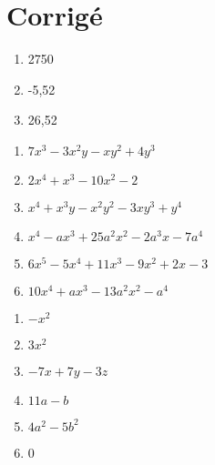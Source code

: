 \section{Corrigé}
\begin{solution} \hfill \vspace{-0.8cm}
\begin{multicols}{3} 
\begin{enumerate} 
\item 2750
\item -5,52
\item 26,52
\end{enumerate}
\end{multicols}
\end{solution}

\begin{solution} \hfill \vspace{-0.8cm}
\begin{multicols}{2}
\begin{enumerate}
\item $7{{x}^{3}}-3{{x}^{2}}y-x{{y}^{2}}+4{{y}^{3}}$	
\item $2{{x}^{4}}+{{x}^{3}}-10{{x}^{2}}-2$	
\item ${{x}^{4}}+{{x}^{3}}y-{{x}^{2}}{{y}^{2}}-3x{{y}^{3}}+{{y}^{4}}$	
\item ${{x}^{4}}-a{{x}^{3}}+25{{a}^{2}}{{x}^{2}}-2{{a}^{3}}x-7{{a}^{4}}$
\item $6{{x}^{5}}-5{{x}^{4}}+11{{x}^{3}}-9{{x}^{2}}+2x-3$
\item $10{{x}^{4}}+a{{x}^{3}}-13{{a}^{2}}{{x}^{2}}-{{a}^{4}}$
\end{enumerate}
\end{multicols}
\end{solution}
	
\begin{solution} \hfill \vspace{-0.8cm}
\begin{multicols}{2}
\begin{enumerate}
\item $-{{x}^{2}}$
\item $3{{x}^{2}}$
\item $-7x+7y-3z$	
\item $11a-b$
\item $4{{a}^{2}}-5{{b}^{2}}$	
\item $0$
\end{enumerate}
\end{multicols}
\end{solution}


